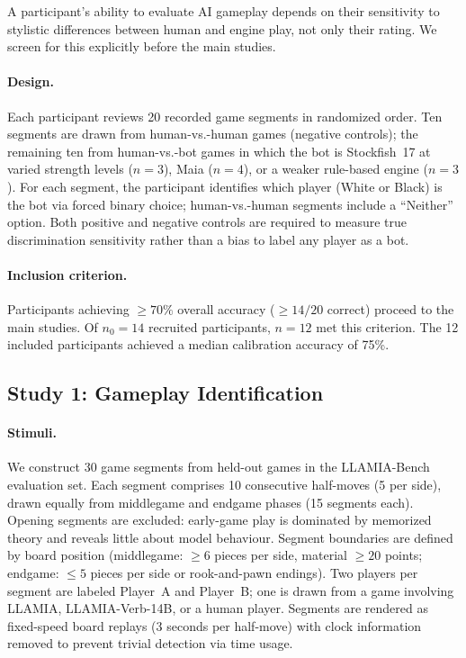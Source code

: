 A participant's ability to evaluate AI gameplay depends on their sensitivity to stylistic differences between human and engine play, not only their rating. We screen for this explicitly before the main studies.

\paragraph{Design.}
Each participant reviews 20 recorded game segments in randomized order. Ten segments are drawn from human-vs.-human games (negative controls); the remaining ten from human-vs.-bot games in which the bot is Stockfish~17 at varied strength levels ($n = 3$), Maia ($n = 4$), or a weaker rule-based engine ($n = 3$). For each segment, the participant identifies which player (White or Black) is the bot via forced binary choice; human-vs.-human segments include a ``Neither'' option. Both positive and negative controls are required to measure true discrimination sensitivity rather than a bias to label any player as a bot.

\paragraph{Inclusion criterion.}
Participants achieving $\geq 70\%$ overall accuracy ($\geq 14{/}20$ correct) proceed to the main studies. Of $n_0 = 14$ recruited participants, $n = 12$ met this criterion. The 12 included participants achieved a median calibration accuracy of 75\%.

\subsection{Study 1: Gameplay Identification}
\label{sec:app_human_gameplay}

\paragraph{Stimuli.}
We construct 30 game segments from held-out games in the LLAMIA-Bench evaluation set. Each segment comprises 10 consecutive half-moves (5 per side), drawn equally from middlegame and endgame phases (15 segments each). Opening segments are excluded: early-game play is dominated by memorized theory and reveals little about model behaviour. Segment boundaries are defined by board position (middlegame: $\geq 6$ pieces per side, material $\geq 20$ points; endgame: $\leq 5$ pieces per side or rook-and-pawn endings). Two players per segment are labeled Player~A and Player~B; one is drawn from a game involving LLAMIA, LLAMIA-Verb-14B, or a human player. Segments are rendered as fixed-speed board replays (3 seconds per half-move) with clock information removed to prevent trivial detection via time usage.

